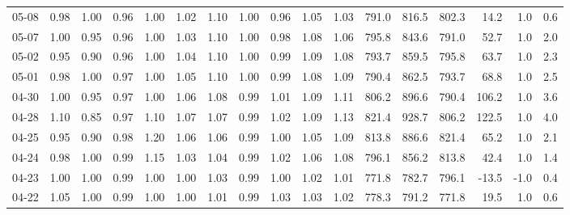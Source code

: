 \begin{threeparttable}
{\begin{tabular}{lrrrrrrrrrrrrrrrr}
  05-08 &   0.98 &   1.00 &         0.96 &     1.00 &           1.02 &        1.10 &        1.00 &        0.96 &          1.05 &          1.03 & 791.0 & 816.5 & 802.3 &       14.2 &                      1.0 &                 0.6 \\
  05-07 &   1.00 &   0.95 &         0.96 &     1.00 &           1.03 &        1.10 &        1.00 &        0.98 &          1.08 &          1.06 & 795.8 & 843.6 & 791.0 &       52.7 &                      1.0 &                 2.0 \\
  05-02 &   0.95 &   0.90 &         0.96 &     1.00 &           1.04 &        1.10 &        1.00 &        0.99 &          1.09 &          1.08 & 793.7 & 859.5 & 795.8 &       63.7 &                      1.0 &                 2.3 \\
  05-01 &   0.98 &   1.00 &         0.97 &     1.00 &           1.05 &        1.10 &        1.00 &        0.99 &          1.08 &          1.09 & 790.4 & 862.5 & 793.7 &       68.8 &                      1.0 &                 2.5 \\
  04-30 &   1.00 &   0.95 &         0.97 &     1.00 &           1.06 &        1.08 &        0.99 &        1.01 &          1.09 &          1.11 & 806.2 & 896.6 & 790.4 &      106.2 &                      1.0 &                 3.6 \\
  04-28 &   1.10 &   0.85 &         0.97 &     1.10 &           1.07 &        1.07 &        0.99 &        1.02 &          1.09 &          1.13 & 821.4 & 928.7 & 806.2 &      122.5 &                      1.0 &                 4.0 \\
  04-25 &   0.95 &   0.90 &         0.98 &     1.20 &           1.06 &        1.06 &        0.99 &        1.00 &          1.05 &          1.09 & 813.8 & 886.6 & 821.4 &       65.2 &                      1.0 &                 2.1 \\
  04-24 &   0.98 &   1.00 &         0.99 &     1.15 &           1.03 &        1.04 &        0.99 &        1.02 &          1.06 &          1.08 & 796.1 & 856.2 & 813.8 &       42.4 &                      1.0 &                 1.4 \\
  04-23 &   1.00 &   1.00 &         0.99 &     1.00 &           1.00 &        1.03 &        0.99 &        1.00 &          1.02 &          1.01 & 771.8 & 782.7 & 796.1 &      -13.5 &                     -1.0 &                 0.4 \\
  04-22 &   1.05 &   1.00 &         0.99 &     1.00 &           1.00 &        1.01 &        0.99 &        1.03 &          1.03 &          1.02 & 778.3 & 791.2 & 771.8 &       19.5 &                      1.0 &                 0.6 \\

\end{tabular}}
\end{threeparttable}
